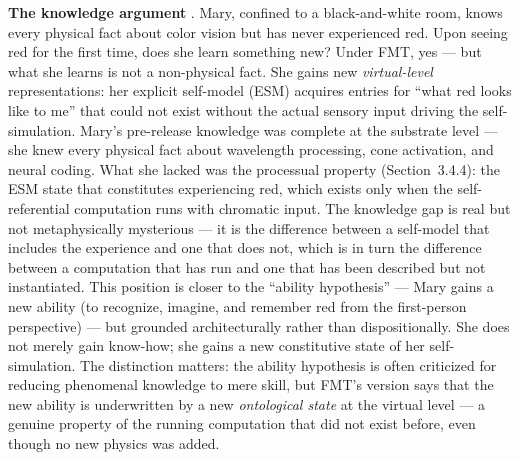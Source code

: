 \documentclass[12pt]{article}
\begin{document}
{\textbf{The knowledge argument} \citep{Jackson1982}. Mary, confined to a black-and-white room, knows every physical fact about color vision but has never experienced red. Upon seeing red for the first time, does she learn something new? Under FMT, yes --- but what she learns is not a non-physical fact. She gains new \emph{virtual-level} representations: her explicit self-model (ESM) acquires entries for ``what red looks like to me'' that could not exist without the actual sensory input driving the self-simulation. Mary's pre-release knowledge was complete at the substrate level --- she knew every physical fact about wavelength processing, cone activation, and neural coding. What she lacked was the processual property (Section~3.4.4): the ESM state that constitutes experiencing red, which exists only when the self-referential computation runs with chromatic input. The knowledge gap is real but not metaphysically mysterious --- it is the difference between a self-model that includes the experience and one that does not, which is in turn the difference between a computation that has run and one that has been described but not instantiated. This position is closer to the ``ability hypothesis'' \citep{Lewis1988,Nemirow1990} --- Mary gains a new ability (to recognize, imagine, and remember red from the first-person perspective) --- but grounded architecturally rather than dispositionally. She does not merely gain know-how; she gains a new constitutive state of her self-simulation. The distinction matters: the ability hypothesis is often criticized for reducing phenomenal knowledge to mere skill, but FMT's version says that the new ability is underwritten by a new \emph{ontological state} at the virtual level --- a genuine property of the running computation that did not exist before, even though no new physics was added.

}
\end{document}
